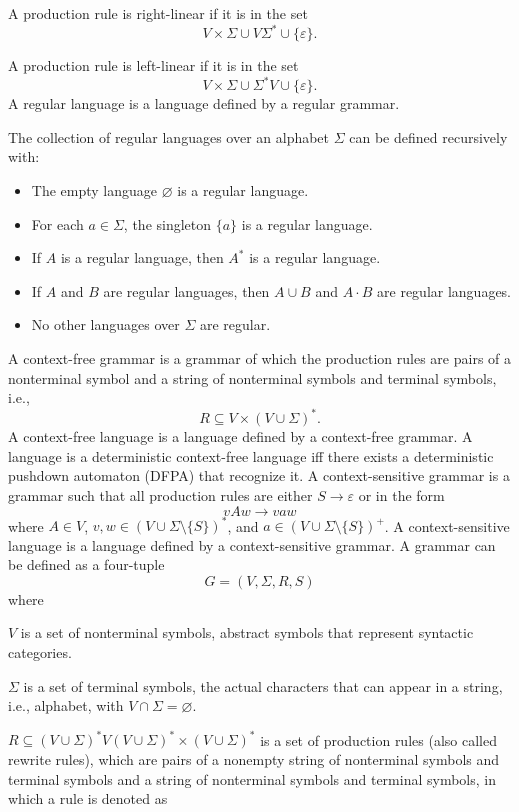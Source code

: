 \documentclass[a4paper,12pt]{article}
\begin{document}
A production rule is right-linear if it is in the set
\[V\times\Sigma\cup V\Sigma^*\cup\{\varepsilon\}.\]

A production rule is left-linear if it is in the set
\[V\times\Sigma\cup \Sigma^*V\cup\{\varepsilon\}.\]
A regular language is a language defined by a regular grammar.

The collection of regular languages over an alphabet $\Sigma$ can be defined recursively with:
\begin{itemize}
\item The empty language $\varnothing$ is a regular language.
\item For each $a\in\Sigma$, the singleton $\{a\}$ is a regular language.
\item If $A$ is a regular language, then $A^*$ is a regular language.
\item If $A$ and $B$ are regular languages, then $A\cup B$ and $A\cdot B$ are regular languages.
\item No other languages over $\Sigma$ are regular.
\end{itemize}
A context-free grammar is a grammar of which the production rules are pairs of a nonterminal symbol and a string of nonterminal symbols and terminal symbols, i.e.,
\[R\subseteq V\times (V\cup\Sigma)^*.\]
A context-free language is a language defined by a context-free grammar.
A language is a deterministic context-free language iff there exists a deterministic pushdown automaton (DFPA) that recognize it.
A context-sensitive grammar is a grammar such that all production rules are either $S\to\varepsilon$ or in the form
\[vAw\to vaw\]
where $A\in V$, $v,w\in(V\cup\Sigma\setminus\{S\})^*$, and $a\in(V\cup\Sigma\setminus\{S\})^+$.
A context-sensitive language is a language defined by a context-sensitive grammar.
A grammar can be defined as a four-tuple
\[G=(V,\Sigma,R,S)\]
where
\bit
\item $V$ is a set of nonterminal symbols, abstract symbols that represent syntactic categories.
\item $\Sigma$ is a set of terminal symbols, the actual characters that can appear in a string, i.e., alphabet, with $V\cap\Sigma=\varnothing$.
\item $R\subseteq (V\cup\Sigma)^*V(V\cup\Sigma)^*\times (V\cup\Sigma)^*$ is a set of production rules (also called rewrite rules), which are pairs of a nonempty string of nonterminal symbols and terminal symbols and a string of nonterminal symbols and terminal symbols, in which a rule is denoted as
\end{document}

